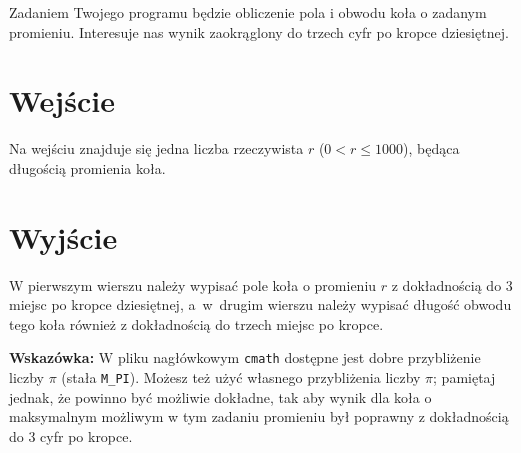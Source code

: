 \documentclass{spiral-kurs}
\begin{document}
\makeheader
%
  Zadaniem Twojego programu będzie obliczenie pola i obwodu
  koła o zadanym promieniu.
  Interesuje nas wynik zaokrąglony do trzech cyfr po kropce dziesiętnej.

  \section{Wejście}
  Na wejściu znajduje się jedna liczba rzeczywista $r$
  ($0 < r \le 1000$), będąca długością promienia koła.

  \section{Wyjście}
  W pierwszym wierszu należy wypisać pole koła o promieniu
  $r$ z dokładnością do 3 miejsc po kropce dziesiętnej, a~w~drugim wierszu należy wypisać długość obwodu tego koła również
  z dokładnością do trzech miejsc po kropce.


  \medskip
  \noindent
  \textbf{Wskazówka:} W pliku nagłówkowym \texttt{cmath} dostępne jest dobre przybliżenie
  liczby $\pi$ (stała \texttt{M\_PI}).
  Możesz też użyć własnego przybliżenia liczby $\pi$; pamiętaj jednak, że powinno być możliwie dokładne, tak
  aby wynik dla koła o maksymalnym możliwym w tym zadaniu promieniu był poprawny z dokładnością do 3 cyfr po kropce.


  
\end{document}
